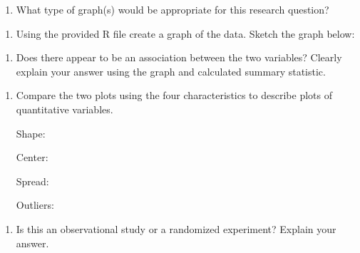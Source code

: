 \documentclass[
]{report}
\providecommand{\tightlist}{%
  \setlength{\itemsep}{0pt}\setlength{\parskip}{0pt}}
\begin{document}
\vspace{0.4in}

\begin{enumerate}
\def\labelenumi{\alph{enumi}.}
\setcounter{enumi}{5}
\tightlist
\item
  What type of graph(s) would be appropriate for this research question?
\end{enumerate}

\vspace{0.2in}

\newpage

\begin{enumerate}
\def\labelenumi{\alph{enumi}.}
\setcounter{enumi}{6}
\tightlist
\item
  Using the provided R file create a graph of the data. Sketch the graph below:
\end{enumerate}

\vspace{2in}

\begin{enumerate}
\def\labelenumi{\alph{enumi}.}
\setcounter{enumi}{7}
\tightlist
\item
  Does there appear to be an association between the two variables? Clearly explain your answer using the graph and calculated summary statistic.
\end{enumerate}

\vspace{0.8in}

\begin{enumerate}
\def\labelenumi{\roman{enumi}.}
\item
  Compare the two plots using the four characteristics to describe plots of quantitative variables.
  \vspace{0.1in}

  Shape:
  \vspace{0.2in}

  Center:
  \vspace{0.2in}

  Spread:
  \vspace{0.2in}

  Outliers:
  \vspace{0.2in}
\end{enumerate}

\begin{enumerate}
\def\labelenumi{\alph{enumi}.}
\setcounter{enumi}{9}
\tightlist
\item
  Is this an observational study or a randomized experiment? Explain your answer.
\end{enumerate}
\end{document}

